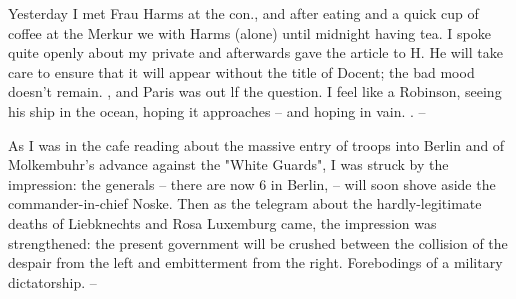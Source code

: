 
Yesterday I met Frau Harms at the con., and after eating and a quick cup of coffee at the Merkur we with Harms (alone) until midnight having tea. I spoke quite openly about my private  and afterwards gave the article to H. He will take care to ensure that it will appear without the title of Docent; the bad mood doesn't remain. , and Paris was out lf the question. I feel like a Robinson, seeing his ship in the ocean, hoping it approaches -- and hoping in vain. . --

\missing

As I was in the cafe reading about the massive entry of troops into Berlin and of Molkembuhr's advance against the "White Guards", I was struck by the impression: the generals -- there are now 6 in Berlin,  -- will soon shove aside the commander-in-chief Noske. Then as the telegram about the hardly-legitimate deaths of Liebknechts and Rosa Luxemburg came, the impression was strengthened: the present government will be crushed between the collision of the despair from the left and embitterment from the right. Forebodings of a military dictatorship. --